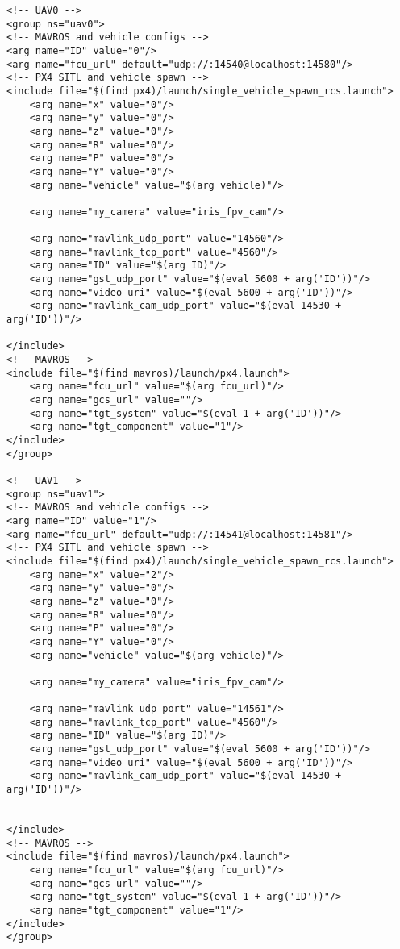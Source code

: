 \begin{verbatim}
<!-- UAV0 -->
<group ns="uav0">
<!-- MAVROS and vehicle configs -->
<arg name="ID" value="0"/>
<arg name="fcu_url" default="udp://:14540@localhost:14580"/>
<!-- PX4 SITL and vehicle spawn -->
<include file="$(find px4)/launch/single_vehicle_spawn_rcs.launch">
    <arg name="x" value="0"/>
    <arg name="y" value="0"/>
    <arg name="z" value="0"/>
    <arg name="R" value="0"/>
    <arg name="P" value="0"/>
    <arg name="Y" value="0"/>
    <arg name="vehicle" value="$(arg vehicle)"/>

    <arg name="my_camera" value="iris_fpv_cam"/>

    <arg name="mavlink_udp_port" value="14560"/>
    <arg name="mavlink_tcp_port" value="4560"/>
    <arg name="ID" value="$(arg ID)"/>
    <arg name="gst_udp_port" value="$(eval 5600 + arg('ID'))"/>
    <arg name="video_uri" value="$(eval 5600 + arg('ID'))"/>
    <arg name="mavlink_cam_udp_port" value="$(eval 14530 + arg('ID'))"/>

</include>
<!-- MAVROS -->
<include file="$(find mavros)/launch/px4.launch">
    <arg name="fcu_url" value="$(arg fcu_url)"/>
    <arg name="gcs_url" value=""/>
    <arg name="tgt_system" value="$(eval 1 + arg('ID'))"/>
    <arg name="tgt_component" value="1"/>
</include>
</group>

<!-- UAV1 -->
<group ns="uav1">                              
<!-- MAVROS and vehicle configs -->
<arg name="ID" value="1"/>
<arg name="fcu_url" default="udp://:14541@localhost:14581"/>
<!-- PX4 SITL and vehicle spawn -->
<include file="$(find px4)/launch/single_vehicle_spawn_rcs.launch">
    <arg name="x" value="2"/>
    <arg name="y" value="0"/>
    <arg name="z" value="0"/>
    <arg name="R" value="0"/>
    <arg name="P" value="0"/>
    <arg name="Y" value="0"/>
    <arg name="vehicle" value="$(arg vehicle)"/>

    <arg name="my_camera" value="iris_fpv_cam"/>

    <arg name="mavlink_udp_port" value="14561"/>
    <arg name="mavlink_tcp_port" value="4560"/>
    <arg name="ID" value="$(arg ID)"/>
    <arg name="gst_udp_port" value="$(eval 5600 + arg('ID'))"/>
    <arg name="video_uri" value="$(eval 5600 + arg('ID'))"/>
    <arg name="mavlink_cam_udp_port" value="$(eval 14530 + arg('ID'))"/>


</include>
<!-- MAVROS -->
<include file="$(find mavros)/launch/px4.launch">
    <arg name="fcu_url" value="$(arg fcu_url)"/>
    <arg name="gcs_url" value=""/>
    <arg name="tgt_system" value="$(eval 1 + arg('ID'))"/>
    <arg name="tgt_component" value="1"/>
</include>
</group>
\end{verbatim}


